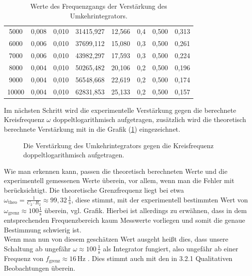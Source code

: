 \begin{table}[h]
\begin{tabular}{c||c|c|c|c|c|c|c}
      5000  & 0,008 & 0,010 & 31415,927 & 12,566 & 0,4   & 0,500 & 0,313 \\
      6000  & 0,006 & 0,010 & 37699,112 & 15,080 & 0,3   & 0,500 & 0,261 \\
      7000  & 0,006 & 0,010 & 43982,297 & 17,593 & 0,3   & 0,500 & 0,224 \\
      8000  & 0,004 & 0,010 & 50265,482 & 20,106 & 0,2   & 0,500 & 0,196 \\
      9000  & 0,004 & 0,010 & 56548,668 & 22,619 & 0,2   & 0,500 & 0,174 \\
      10000 & 0,004 & 0,010 & 62831,853 & 25,133 & 0,2   & 0,500 & 0,157 \\
      \end{tabular}
      \caption{Werte des Frequenzgangs der Verstärkung des Umkehrintegrators.}
      \label{tab:Umkehrintegrator}
  \end{table}\newpage
Im nächsten Schritt wird die experimentelle Verstärkung gegen die berechnete Kreisfrequenz $\omega$ 
doppeltlogarithmisch aufgetragen, zusätzlich wird die theoretisch berechnete Verstärkung mit in 
die Grafik (\ref{fig: UmkehrintegratorDiagramm}) eingezeichnet.
  \begin{figure}[h]
    \centering\scalebox{1}{}
    \caption{Die Verstärkung des Umkehrintegrators gegen die Kreisfrequenz doppeltlogarithmisch aufgetragen. }
    \label{fig: UmkehrintegratorDiagramm}
\end{figure}

Wie man erkennen kann, passen die theoretisch berechneten Werte und die experimentell
gemessenen Werte überein, vor allem, wenn man die Fehler mit berücksichtigt.
Die theoretische Grenzfrequenz liegt bei etwa $\omega_\text{theo} = \frac{1}{C_2 \cdot R_2} \approx 99,32\,\frac{1}{\text{s}}$, diese stimmt, 
mit der experimentell bestimmten Wert von $\omega_\text{grenz} \approx 100 \frac{1}{\text{s}}$ überein, vgl. Grafik. Hierbei ist allerdings zu erwähnen, 
dass in dem entsprechenden Frequenzbereich kaum Messwerte vorliegen
und somit die genaue Bestimmung schwierig ist. \\
Wenn man nun von diesem geschätzen Wert ausgeht heißt dies, dass unsere Schaltung ab ungefähr $\omega \approx 100\,\frac{1}{\text{s}}$ als Integrator fungiert, also ungefähr ab einer Frequenz von $f_\text{grenz} \approx 16\,\text{Hz}$ .
Dies stimmt auch mit den in 3.2.1 Qualitativen Beobachtungen überein.